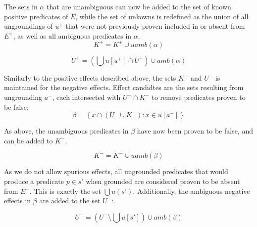 \documentclass[../master.tex]{subfiles}
\begin{document}
    The sets in $\alpha$ that are unambiguous can now be added to the
    set of known positive predicates of $E$, while the set of unkowns
    is redefined as the union of all ungroundings of $u^{+}$ that were
    not previously proven included in or absent from $E^{+}$, as well
    as all ambiguous predicates in $\alpha$.
    \[
    K^{+}=K^{+}\cup uamb\left(\alpha\right)
    \]


    \[
    U^{+}=\left(\bigcup u\left[u^{+}\right]\cap U^{+}\right)\cup amb\left(\alpha\right)
    \]


    Similarly to the positive effects described above, the sets $K^{-}$
    and $U^{-}$ is maintained for the negative effects. Effect candidtes
    are the sets resulting from ungrounding $a^{-}$, each intersected
    with $U^{-}\cap K^{-}$ to remove predicates proven to be false:
    \[
    \beta=\left\{ x\cap\left(U^{-}\cup K^{-}\right):x\in u\left[a^{-}\right]\right\}
    \]


    As above, the unambiguous predicates in $\beta$ have now been proven
    to be false, and can be added to $K^{-}$.

    \[
    K^{-}=K^{-}\cup uamb\left(\beta\right)
    \]


    As we do not allow spurious effects, all ungrounded predicates that
    would produce a predicate $p\in s'$ when grounded are considered
    proven to be absent from $E^{-}$. This is exactly the set $\bigcup u\left(s'\right)$.
    Additionally, the ambiguous negative effects in $\beta$ are added
    to the set $U^{-}$:

    \[
    U^{-}=\left(U^{-}\setminus\bigcup u\left[s'\right]\right)\cup amb\left(\beta\right)
    \]
\end{document}
